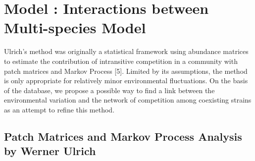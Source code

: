 \documentclass[12pt]{article}
\begin{document}
\section{Model \uppercase\expandafter{}:  Interactions between Multi-species Model}
Ulrich's method was originally a statistical framework using abundance matrices to estimate the contribution of intransitive competition in a community with patch matrices and Markov Process [5]. Limited by its assumptions, the method is only appropriate for relatively minor environmental fluctuations. On the basis of the database, we propose a possible way to find a link between the environmental variation and the network of competition among coexisting strains as an attempt to refine this method.
\subsection{Patch Matrices and Markov Process Analysis by Werner Ulrich}
\end{document}
